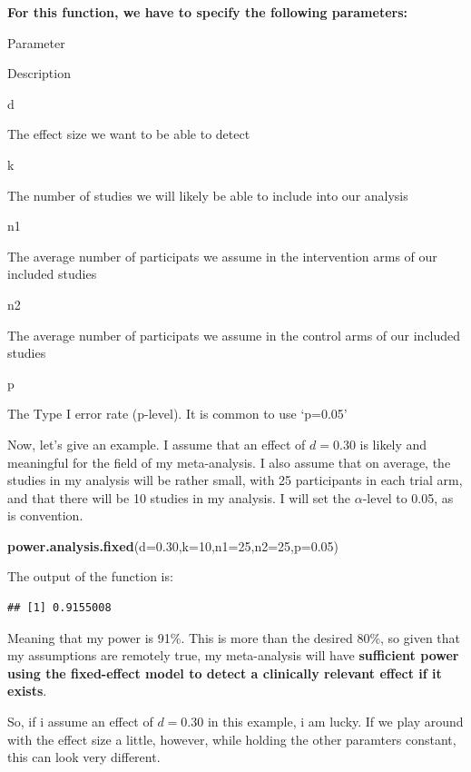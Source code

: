 \documentclass[]{book}
\newenvironment{Shaded}{\begin{snugshade}}{\end{snugshade}}
\newcommand{\DataTypeTok}[1]{\textcolor[rgb]{0.13,0.29,0.53}{#1}}
\newcommand{\DecValTok}[1]{\textcolor[rgb]{0.00,0.00,0.81}{#1}}
\newcommand{\FloatTok}[1]{\textcolor[rgb]{0.00,0.00,0.81}{#1}}
\newcommand{\KeywordTok}[1]{\textcolor[rgb]{0.13,0.29,0.53}{\textbf{#1}}}
\newcommand{\NormalTok}[1]{#1}
\begin{document}
\textbf{For this function, we have to specify the following parameters:}

Parameter

Description

d

The effect size we want to be able to detect

k

The number of studies we will likely be able to include into our analysis

n1

The average number of participats we assume in the intervention arms of our included studies

n2

The average number of participats we assume in the control arms of our included studies

p

The Type I error rate (p-level). It is common to use `p=0.05'

Now, let's give an example. I assume that an effect of \(d=0.30\) is likely and meaningful for the field of my meta-analysis. I also assume that on average, the studies in my analysis will be rather small, with 25 participants in each trial arm, and that there will be 10 studies in my analysis. I will set the \(\alpha\)-level to 0.05, as is convention.

\begin{Shaded}
\begin{Highlighting}[]
\KeywordTok{power.analysis.fixed}\NormalTok{(}\DataTypeTok{d=}\FloatTok{0.30}\NormalTok{,}\DataTypeTok{k=}\DecValTok{10}\NormalTok{,}\DataTypeTok{n1=}\DecValTok{25}\NormalTok{,}\DataTypeTok{n2=}\DecValTok{25}\NormalTok{,}\DataTypeTok{p=}\FloatTok{0.05}\NormalTok{)}
\end{Highlighting}
\end{Shaded}

The output of the function is:

\begin{verbatim}
## [1] 0.9155008
\end{verbatim}

Meaning that my power is 91\%. This is more than the desired 80\%, so given that my assumptions are remotely true, my meta-analysis will have \textbf{sufficient power using the fixed-effect model to detect a clinically relevant effect if it exists}.

So, if i assume an effect of \(d = 0.30\) in this example, i am lucky. If we play around with the effect size a little, however, while holding the other paramters constant, this can look very different.
\end{document}
